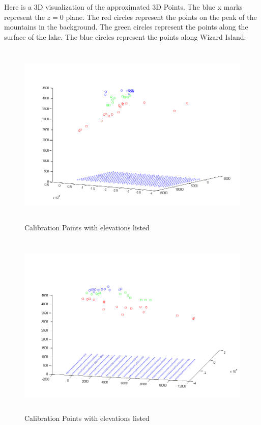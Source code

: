 \documentclass[11pt,psfig]{article}
\begin{document}
\newpage

Here is a 3D visualization of the approximated 3D Points. The blue x marks represent the $z=0$ plane. The red circles represent the points on the peak of the mountains in the background. The green circles represent the points along the surface of the lake. The blue circles represent the points along Wizard Island. 
\begin{figure}[H]
\centering
\includegraphics[height=3.5in]{sfmResults1/triangulationAttempt.png}
\caption{Calibration Points with elevations listed}
\end{figure}
\begin{figure}[H]
\centering
\includegraphics[height=3.5in]{sfmResults1/triangulationAttempt2.png}
\caption{Calibration Points with elevations listed}
\end{figure}
\end{document}
